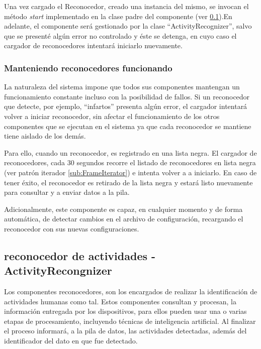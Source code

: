             Una vez cargado el Reconocedor, creado una instancia del mismo, se invocan el método \textit{start} implementado en la clase padre del componente (ver \ref{sub:ClassifierHAR}).En adelante, el componente será gestionado por la clase ``ActivityRecognizer'', salvo que se presenté algún error no controlado y éste se detenga, en cuyo caso el cargador de reconocedores intentará iniciarlo nuevamente.
        
        \subsubsection{Manteniendo reconocedores funcionando}
        \label{sub2:ClassifierKeepAlive}
            La naturaleza del sistema impone que todos sus componentes mantengan un funcionamiento constante incluso con la posibilidad de fallos. Si un reconocedor que detecte, por ejemplo, ``infartos'' presenta algún error, el cargador intentará volver a iniciar reconocedor, sin afectar el funcionamiento de los otros componentes que se ejecutan en el sistema ya que cada reconocedor se mantiene tiene aislado de los demás.
            
            Para ello, cuando un reconocedor, es registrado en una lista negra. El cargador de reconocedores, cada 30 segundos recorre el listado de reconocedores en lista negra (ver patrón iterador \ref{sub:FrameIterator}) e intenta volver a a iniciarlo. En caso de tener éxito, el reconocedor es retirado de la lista negra y estará listo nuevamente para consultar y a enviar datos a la pila.
            
            Adicionalmente, este componente es capaz, en cualquier momento y de forma automática, de detectar cambios en el archivo de configuración, recargando el reconocedor con sus nuevas configuraciones. 
    
    \subsection{reconocedor de actividades - ActivityRecongnizer}
    \label{sub:ClassifierHAR}
    
        Los componentes reconocedores, son los encargados de realizar la identificación de actividades humanas como tal. Estos componentes consultan y procesan, la información entregada por los dispositivos, para ellos pueden usar una o varias etapas de procesamiento, incluyendo técnicas de inteligencia artificial. Al finalizar el proceso informará, a la pila de datos, las actividades detectadas, además del identificador del dato en que fue detectado. 
    
